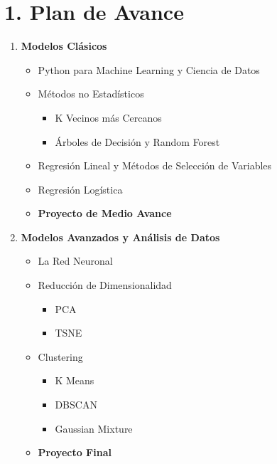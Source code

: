 \documentclass[12pt]{article}
\begin{document}
\section*{\fontsize{25}{25}\rmfamily\color{celeste}1. Plan de Avance}
\vspace*{1.5cm}
\fontsize{15}{15}\rmfamily\color{celeste}
\begin{enumerate}
	\item \textbf{Modelos Clásicos}
	\begin{itemize}
		\item Python para Machine Learning y Ciencia de Datos
		\item Métodos no Estadísticos
		\begin{itemize}
			\item K Vecinos más Cercanos
			\item Árboles de Decisión y Random Forest
		\end{itemize}
		\item Regresión Lineal y Métodos de Selección de Variables
		\item Regresión Logística
		\item \textbf{Proyecto de Medio Avance}
	\end{itemize}
	
	\item \textbf{Modelos Avanzados y Análisis de Datos}
	\begin{itemize}
		\item La Red Neuronal
		\item Reducción de Dimensionalidad
		\begin{itemize}
			\item PCA
			\item TSNE
		\end{itemize}
		\item Clustering
		\begin{itemize}
			\item K Means
			\item DBSCAN
			\item Gaussian Mixture
		\end{itemize}
		\item \textbf{Proyecto Final}
	\end{itemize}
\end{enumerate}

\newpage
{}
\end{document}
